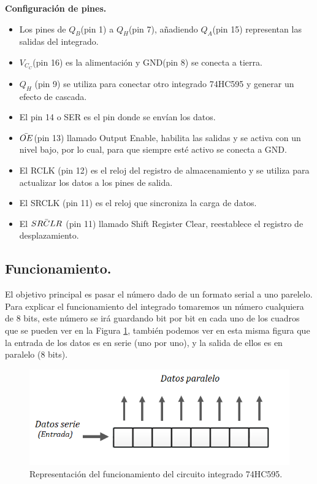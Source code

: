 \documentclass{article}
\begin{document}
\textbf{Configuración de pines.}
\newline
\begin{itemize}
\item Los pines de $Q_B$(pin 1) a $Q_H$(pin 7), añadiendo $Q_A$(pin 15) representan las salidas del integrado.
\item $V_C_C$(pin 16) es la alimentación y GND(pin 8) se conecta a tierra.
\item $Q_H$ (pin 9) se utiliza para conectar otro integrado 74HC595 y generar un efecto de cascada.
\item El pin 14 o SER es el pin donde se envían los datos.
\item $\Bar{OE}$(pin 13) llamado Output Enable, habilita las salidas y se activa con un nivel bajo, por lo cual, para que siempre esté activo se conecta a GND.
\item El RCLK (pin 12) es el reloj del registro de almacenamiento y se utiliza para actualizar los datos a los pines de salida.
\item El SRCLK (pin 11) es el reloj que sincroniza la carga de datos.
\item El $\Bar{SRCLR}$ (pin 11) llamado Shift Register Clear, reestablece el registro de desplazamiento.


\end{itemize}

\subsection{Funcionamiento.}\label{integrado funcionamiento}
El objetivo principal es pasar el número dado de un formato serial a uno parelelo. Para explicar el funcionamiento del integrado tomaremos un número cualquiera de 8 bits, este número se irá guardando bit por bit en cada uno de los cuadros que se pueden ver en la Figura \ref{fig:func1}, también podemos ver en esta misma figura que la entrada de los datos es en serie (uno por uno), y la salida de ellos es en paralelo (8 bits).


\begin{figure}[h]
\includegraphics[scale=0.8]{funcionamiento1.png}
\centering
\caption{Representación del funcionamiento del circuito integrado 74HC595.}
\label{fig:func1}
\end{figure}
\end{document}
